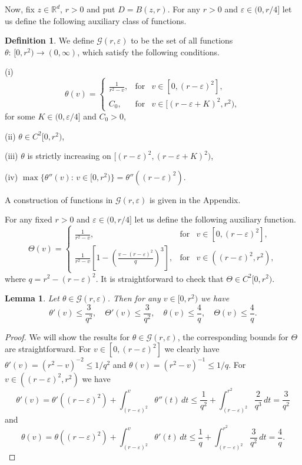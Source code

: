 \documentclass[a4paper,12pt,reqno]{amsart}
\newtheorem{lemma}[theorem]{Lemma}
\theoremstyle{definition}
\newtheorem{definition}[theorem]{Definition}
\theoremstyle{remark}
\newcommand{\eps}{\varepsilon}
\newcommand{\calG}{\mathcal{G}}
\newcommand{\R}{\mathds{R}}
\begin{document}
Now, fix $z \in \R^d$, $r > 0$ and put $D = B(z,r)$.
For any $r > 0$ and $\eps \in (0,r/4]$ let us define the following auxiliary class of functions.  
\begin{definition}
\label{Class_A_1}
We define $\calG(r,\eps)$ to be the set of all functions $\theta: \, [0,r^2) \to (0,\infty)$, which satisfy the following conditions. 

(i) \begin{equation*}
\theta(v)= \left\{              
\begin{array}{lll}                   
\displaystyle{\frac{1}{r^2 - v}},&\text{for}& v \in [0,(r-\eps)^2], \\  
C_0,&\text{for}& v \in [(r-\eps +K)^2,r^2),
\end{array}       
\right. 
\end{equation*}
for some $K \in (0,\eps/4]$ and $C_0 >0$, 

(ii) $\theta \in C^2[0,r^2)$,

(iii) $\theta$ is strictly increasing on $[(r-\eps)^2, (r-\eps +K)^2)$,

(iv) $\max\{\theta''(v): \, v \in [0,r^2)\} = \theta''((r-\eps)^2)$. 
\end{definition}
A construction of functions in $\calG(r,\eps)$ is given in the Appendix.

For any fixed $r > 0$ and $\eps \in (0,r/4]$ let us define the following auxiliary function.
\begin{equation} \label{Theta}
\Theta(v)= \left\{              
\begin{array}{lll}                   
\displaystyle{\frac{1}{r^2 - v}},&\text{for}& v \in [0,(r-\eps)^2], \\  
\frac{1}{r^2 - v}\left[1-\left(\frac{v-(r-\eps)^2}q\right)^3\right],&\text{for}& v  \in ((r-\eps)^2,r^2), 
\end{array}
\right.       
\end{equation}
where $q=r^2- (r-\eps)^2$.
It is straightforward to check that $\Theta \in C^2[0,r^2)$.

\begin{lemma}
\label{theta_estimates}
Let $\theta \in \calG(r,\eps)$. Then for any $v \in [0,r^2)$ we have
$$
\theta'(v) \le \frac{3}{q^2}, \quad \Theta'(v) \le \frac{3}{q^2}, \quad \theta(v) \le \frac{4}{q}, \quad \Theta(v) \le \frac{4}{q}.
$$
\end{lemma}
\begin{proof}
We will show the results for $\theta \in \calG(r,\eps)$, the corresponding bounds for $\Theta$ are straightforward. For $v \in [0,(r - \eps)^2]$ we clearly have $\theta'(v) = (r^2 - v)^{-2} \le 1/q^2$ and $\theta(v) = (r^2 - v)^{-1} \le 1/q$. For $v \in ((r - \eps)^2, r^2)$ we have
$$
\theta'(v) = \theta'((r - \eps)^2) + \int_{(r - \eps)^2}^v \theta''(t) \, dt \le 
\frac{1}{q^2} + \int_{(r - \eps)^2}^{r^2} \frac{2}{q^3} \, dt = \frac{3}{q^2}
$$
and
$$
\theta(v) = \theta((r - \eps)^2) + \int_{(r - \eps)^2}^v \theta'(t) \, dt \le 
\frac{1}{q} + \int_{(r - \eps)^2}^{r^2} \frac{3}{q^2} \, dt = \frac{4}{q}.
$$ \end{proof}
\end{document}
